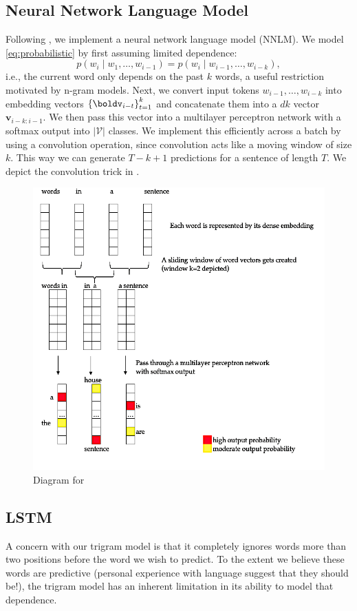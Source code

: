 \documentclass[12pt]{article}
\begin{document}
\subsection{Neural Network Language Model}
\label{sub:nnlm}
Following \cite{bengio2003neural}, we implement a neural network language model
(NNLM). We model \eqref{eq:probabilistic} by first assuming limited dependence: \[
p(w_i \mid w_1,\ldots,w_{i-1}) = p(w_i \mid w_{i-1}, \ldots, w_{i-k}),
\]
i.e., the current word only depends on the past $k$ words, a useful restriction
motivated by n-gram models. Next, we convert input tokens $w_{i-1},\ldots,w_
{i-k}$ into embedding vectors $\br{\boldv_{i-t}}_{t=1}^k$ and concatenate them
into a $dk$ vector $\bm v_{i-k:i-1}$. We then pass this vector into a
multilayer perceptron network with a softmax output into $|\mathcal V|$ classes.
We implement this efficiently across a batch by using a convolution operation,
since convolution acts like a moving window of size $k$. This way we can
generate $T - k + 1$ predictions for a sentence of length $T$. We depict the
convolution trick in . 

\begin{figure}[tb]
    \centering
    \includegraphics[width=.7\textwidth]{figs/nnlang.png}
    \caption{Diagram for }
    \label{fig:nnlm}
\end{figure}

\subsection{LSTM}
\label{subsec:lstm}

A concern with our trigram model is that it completely ignores words more than
two positions before the word we wish to predict. To the extent we believe these
words are predictive (personal experience with language suggest that they should
be!), the trigram model has an inherent limitation in its ability to model that
dependence.
\end{document}
